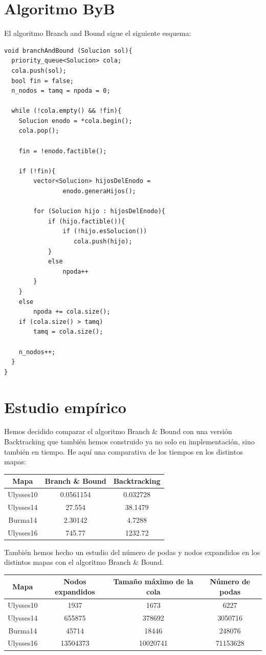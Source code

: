 \documentclass{article}
\begin{document}
	\section{Algoritmo ByB}
	El algoritmo Branch and Bound sigue el siguiente esquema:
	
	\begin{lstlisting}
void branchAndBound (Solucion sol){
  priority_queue<Solucion> cola;
  cola.push(sol);
  bool fin = false;
  n_nodos = tamq = npoda = 0;

  while (!cola.empty() && !fin){
	Solucion enodo = *cola.begin();
	cola.pop();

	fin = !enodo.factible();

	if (!fin){
		vector<Solucion> hijosDelEnodo = 
				enodo.generaHijos();

		for (Solucion hijo : hijosDelEnodo){
			if (hijo.factible()){
				if (!hijo.esSolucion())
				   cola.push(hijo);
			}
			else
				npoda++
		}
	}
	else
		npoda += cola.size();
	if (cola.size() > tamq)
		tamq = cola.size();
		
	n_nodos++;
  }
}
	\end{lstlisting}
	
	\section{Estudio empírico}
	Hemos decidido comparar el algoritmo Branch \& Bound con una versión Backtracking que también hemos construido ya no solo en implementación, sino también en tiempo. He aquí una comparativa de los tiempos en los distintos mapas:
	
	\begin{longtable}{|c|c|c|}
		\hline
		Mapa & Branch \& Bound & Backtracking \\ \hline
		Ulysses10 & 0.0561154 & 0.032728  \\ \hline
		Ulysses14 & 27.554 & 38.1479 \\ \hline
		Burma14 & 2.30142 & 4.7288\\ \hline
		Ulysses16 & 745.77 & 1232.72\\ \hline
	\end{longtable}

	También hemos hecho un estudio del número de podas y nodos expandidos en los distintos mapas con el algoritmo Branch \& Bound.
	
	\begin{longtable}{|c|c|c|c|}
		\hline
		Mapa & Nodos expandidos & Tamaño máximo de la cola & Número de podas \\ \hline
		Ulysses10 & 1937 & 1673 & 6227  \\ \hline
		Ulysses14 & 655875 & 378692 & 3050716 \\ \hline
		Burma14 & 45714 & 18446 & 248076 \\ \hline
		Ulysses16 & 13504373 & 10020741 & 71153628 \\ \hline
	\end{longtable}
\end{document}
